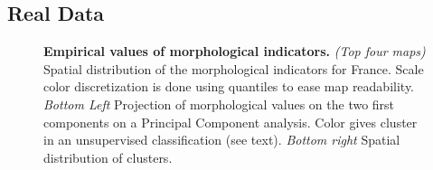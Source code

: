 \documentclass[10pt,letterpaper]{article}
\begin{document}
\subsection*{Real Data}



\begin{figure}[!h]
\caption{\textbf{Empirical values of morphological indicators.} \textit{(Top four maps)} Spatial distribution of the morphological indicators for France. Scale color discretization is done using quantiles to ease map readability. \textit{Bottom Left} Projection of morphological values on the two first components on a Principal Component analysis. Color gives cluster in an unsupervised classification (see text). \textit{Bottom right} Spatial distribution of clusters.}
\label{fig:empirical}
\end{figure}
\end{document}
